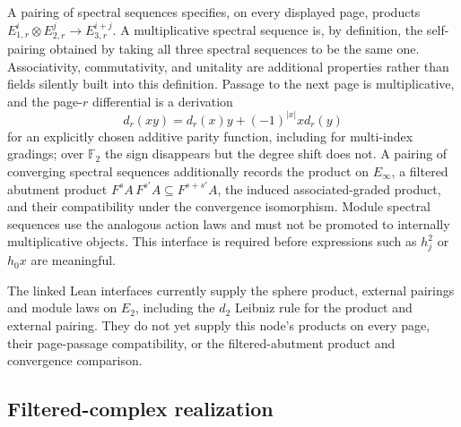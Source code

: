 \begin{definition}
  \label{def:multiplicative-ss}
  \notready
  A pairing of spectral sequences specifies, on every displayed page,
  products $E_{1,r}^i\otimes E_{2,r}^j\to E_{3,r}^{i+j}$.  A multiplicative
  spectral sequence is, by definition, the self-pairing obtained by taking
  all three spectral sequences to be the same one.  Associativity,
  commutativity, and unitality are additional properties rather than fields
  silently built into this definition.  Passage to the next page is
  multiplicative, and the
  page-$r$ differential is a derivation
  \[
    d_r(xy)=d_r(x)y+(-1)^{|x|}x d_r(y)
  \]
  for an explicitly chosen additive parity function, including for
  multi-index gradings; over $\mathbb F_2$ the sign disappears but the degree
  shift does not.  A pairing of converging spectral sequences additionally
  records the product on $E_\infty$, a filtered abutment product
  $F^sA\,F^{s'}A\subseteq F^{s+s'}A$, the induced associated-graded product,
  and their compatibility under the convergence isomorphism.  Module
  spectral sequences use the analogous action laws and must not be promoted
  to internally multiplicative objects.  This interface is required before
  expressions such as $h_j^2$ or $h_0x$ are meaningful.

  The linked Lean interfaces currently supply the sphere product, external
  pairings and module laws on $E_2$, including the $d_2$ Leibniz rule for the
  product and external pairing.  They do not yet supply this node's products
  on every page, their page-passage compatibility, or the filtered-abutment
  product and convergence comparison.
\end{definition}



\subsection{Filtered-complex realization}

